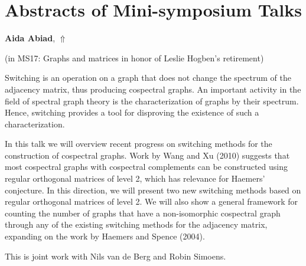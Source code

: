 \documentclass[ILAS2025-program.tex]{subfiles}
\begin{document}
\section{Abstracts of Mini-symposium Talks}
 \hypertarget{down0179}{}\begin{ilasabstract}
    
    \textbf{Aida Abiad},  \hfill \hyperlink{up0179}{$\Uparrow$}
    
    (in {\color{mstitle}MS17: Graphs and matrices in honor of Leslie Hogben's retirement})
        
        \mtskip
    Switching is an operation on a graph that does not change the spectrum of the adjacency matrix, thus producing cospectral graphs. An important activity in the field of spectral graph theory is the characterization of graphs by their spectrum. Hence, switching provides a tool for disproving the existence of such a characterization. 

In this talk we will overview recent progress on switching methods for the construction of cospectral graphs. Work by Wang and Xu (2010) suggests that most cospectral graphs with cospectral complements can be constructed using regular orthogonal matrices of level 2, which has relevance for Haemers' conjecture. In this direction, we will present two new switching methods based on regular orthogonal matrices of level 2. We will also show a general framework for counting the number of graphs that have a non-isomorphic cospectral graph through any of the existing switching methods for the adjacency matrix, expanding on the work by Haemers and Spence (2004).  

This is joint work with Nils van de Berg and Robin Simoens.
\end{ilasabstract}
\end{document}
